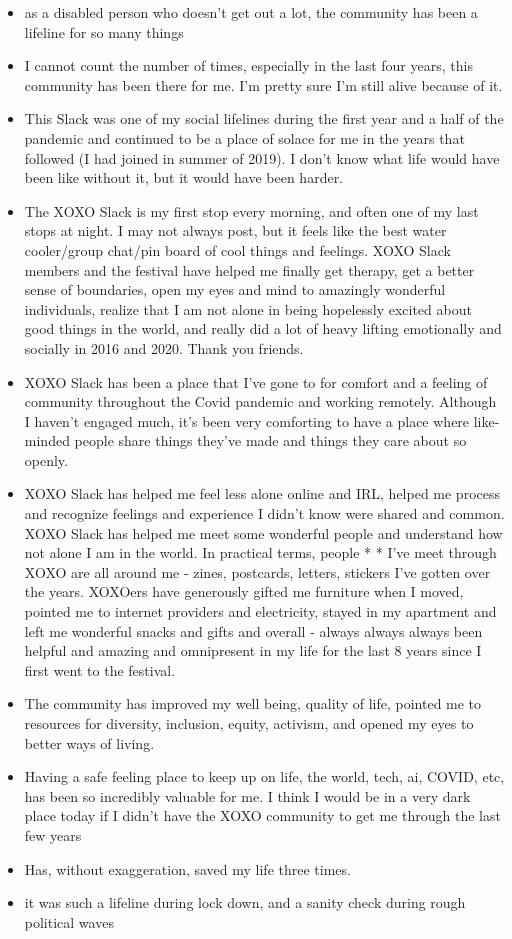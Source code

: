 \documentclass[
]{book}
\providecommand{\tightlist}{%
  \setlength{\itemsep}{0pt}\setlength{\parskip}{0pt}}
\begin{document}
\begin{itemize}
\tightlist
\item
  as a disabled person who doesn't get out a lot, the community has been a lifeline for so many things
\item
  I cannot count the number of times, especially in the last four years, this community has been there for me. I'm pretty sure I'm still alive because of it.
\item
  This Slack was one of my social lifelines during the first year and a half of the pandemic and continued to be a place of solace for me in the years that followed (I had joined in summer of 2019). I don't know what life would have been like without it, but it would have been harder.
\item
  The XOXO Slack is my first stop every morning, and often one of my last stops at night. I may not always post, but it feels like the best water cooler/group chat/pin board of cool things and feelings. XOXO Slack members and the festival have helped me finally get therapy, get a better sense of boundaries, open my eyes and mind to amazingly wonderful individuals, realize that I am not alone in being hopelessly excited about good things in the world, and really did a lot of heavy lifting emotionally and socially in 2016 and 2020. Thank you friends.
\item
  XOXO Slack has been a place that I've gone to for comfort and a feeling of community throughout the Covid pandemic and working remotely. Although I haven't engaged much, it's been very comforting to have a place where like-minded people share things they've made and things they care about so openly.
\item
  XOXO Slack has helped me feel less alone online and IRL, helped me process and recognize feelings and experience I didn't know were shared and common. XOXO Slack has helped me meet some wonderful people and understand how not alone I am in the world. In practical terms, people * * I've meet through XOXO are all around me - zines, postcards, letters, stickers I've gotten over the years. XOXOers have generously gifted me furniture when I moved, pointed me to internet providers and electricity, stayed in my apartment and left me wonderful snacks and gifts and overall - always always always been helpful and amazing and omnipresent in my life for the last 8 years since I first went to the festival.
\item
  The community has improved my well being, quality of life, pointed me to resources for diversity, inclusion, equity, activism, and opened my eyes to better ways of living.
\item
  Having a safe feeling place to keep up on life, the world, tech, ai, COVID, etc, has been so incredibly valuable for me. I think I would be in a very dark place today if I didn't have the XOXO community to get me through the last few years
\item
  Has, without exaggeration, saved my life three times.
\item
  it was such a lifeline during lock down, and a sanity check during rough political waves
\end{itemize}
\end{document}

